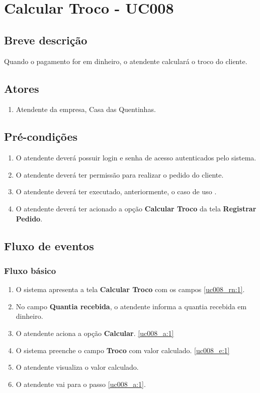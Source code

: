 \chapter{Calcular Troco - UC008} \label{uc008}

\section{Breve descrição}

Quando o pagamento for em dinheiro, o atendente calculará o troco do cliente.

\section{Atores}

\begin{enumerate}
	\item Atendente da empresa, Casa das Quentinhas.
\end{enumerate}

\section{Pré-condições}

\begin{enumerate}
	\item O atendente deverá possuir login e senha de acesso autenticados pelo sistema.
	\item O atendente deverá ter permissão para realizar o pedido do cliente.
	\item O atendente deverá ter executado, anteriormente, o caso de uso .
	\item O atendente deverá ter acionado a opção \textbf{Calcular Troco} da tela \textbf{Registrar Pedido}.
\end{enumerate}

\section{Fluxo de eventos}

\subsection{Fluxo básico}

\begin{enumerate}[label=P\arabic*]
	\item O sistema apresenta a tela \textbf{Calcular Troco} com os campos \ref{uc008_rn:1}. \label{uc008_p:1}
	\item No campo \textbf{Quantia recebida}, o atendente informa a quantia recebida em dinheiro. \label{uc008_p:2}	
	\item O atendente aciona a opção \textbf{Calcular}. \label{uc008_p:3}\ref{uc008_a:1}
	\item O sistema preenche o campo \textbf{Troco} com valor calculado. \ref{uc008_e:1}
	\item O atendente visualiza o valor calculado.
	\item O atendente vai para o passo \ref{uc008_a:1}.	
\end{enumerate}

